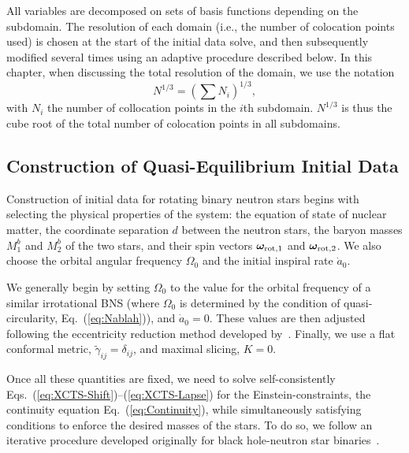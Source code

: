   All variables are decomposed on sets of basis functions depending on the subdomain. 
  The resolution of each domain (i.e., the number of colocation points used) 
is chosen at the start of the initial data solve, and then
subsequently modified several times using an adaptive procedure
described below. In this chapter, when discussing the total resolution of the
domain, we use the notation 
\begin{equation}
N^{1/3} = \left(\sum
N_i\right)^{1/3},
\end{equation}
with $N_i$ the number of collocation points in the $i$th subdomain. $N^{1/3}$ is thus the cube root of the total number of
colocation points in all subdomains. 

\subsection{Construction of Quasi-Equilibrium Initial Data}
\label{sec:IDalgorithm}

Construction of initial data for rotating binary neutron stars
begins with selecting the physical properties of the system: the equation of
state of nuclear matter, the coordinate separation $d$ between the
neutron stars, the baryon masses $M^b_1$ and $M^b_2$ of the two stars, and their
spin vectors ${\bm \omega}_{\rm rot,1}$ and ${\bm \omega}_{\rm
  rot,2}$. We also choose the orbital angular frequency $\Omega_0$
and the initial inspiral rate $\dot{a}_0$. 

We generally begin by setting $\Omega_0$ to the value for the orbital frequency of a similar irrotational BNS (where $\Omega_0$ is determined by the condition of quasi-circularity, Eq.~(\ref{eq:Nablah})), and $\dot a_0=0$. These values are then adjusted following the eccentricity reduction method
developed by~\cite{Pfeiffer-Brown-etal:2007}. Finally, we use a flat conformal metric, $\tilde\gamma_{ij}=\delta_{ij}$,
and maximal slicing, $K=0$.

Once all these quantities are fixed, we need to solve self-consistently Eqs.~(\ref{eq:XCTS-Shift})--(\ref{eq:XCTS-Lapse}) for the Einstein-constraints, the continuity equation Eq.~(\ref{eq:Continuity}), while simultaneously satisfying conditions to enforce the desired masses of the stars. 
To do so, we follow an iterative procedure developed originally for black hole-neutron star
binaries~\citep{FoucartEtAl:2011}.

